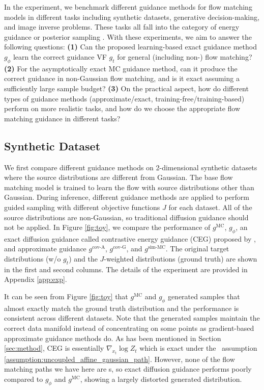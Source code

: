 


In the experiment, we benchmark different guidance methods for flow matching models in different tasks including synthetic datasets, generative decision-making, and image inverse problems. These tasks all fall into the category of energy guidance \citep{janner_planning_2022,lu_contrastive_nodate} or posterior sampling \cite{chung_diffusion_2024}. 
With these experiments, we aim to answer the following questions:
    \textbf{(1)} Can the proposed learning-based exact guidance method $g_\phi$ learn the correct guidance VF $g_t$ for general (including non-\diffusionpath) flow matching?
    \textbf{(2)} For the asymptotically exact MC guidance method, can it produce the correct guidance in non-Gaussian flow matching, and is it exact assuming a sufficiently large sample budget?
    \textbf{(3)} On the practical aspect, how do different types of guidance methods (approximate/exact, training-free/training-based) perform on more realistic tasks, and how do we choose the appropriate flow matching guidance in different tasks?



\subsection{Synthetic Dataset}
We first compare different guidance methods on 2-dimensional synthetic datasets where the source distributions are different from Gaussian. 
The base flow matching model is trained to learn the flow with source distributions other than Gaussian. 
During inference, different guidance methods are applied to perform guided sampling with different objective functions $J$ for each dataset. All of the source distributions are non-Gaussian, so traditional diffusion guidance should not be applied. In Figure \ref{fig:toy}, we compare the performance of $g^{\text{MC}}$, $g_\phi$, an exact diffusion guidance called contrastive energy guidance (CEG) proposed by \citet{lu_contrastive_nodate}, and approximate guidance $g^{\text{cov-A}}$, $g^{\text{cov-G}}$, and $g^{\text{sim-MC}}$. The original target distributions (w/o $g_t$) and the $J$-weighted distributions (ground truth) are shown in the first and second columns. 
The details of the experiment are provided in Appendix \ref{app:exp}.

It can be seen from Figure \ref{fig:toy} that $g^{\text{MC}}$ and $g_{\phi}$ generated samples that almost exactly match the ground truth distribution and the performance is consistent across different datasets. 
Note that the generated samples maintain the correct data manifold instead of concentrating on some points as gradient-based approximate guidance methods do.
As has been mentioned in Section \ref{sec:method}, CEG is essentially $\nabla_{x_t}\log Z_t$ which is exact under the \diffusionpath~assumption \ref{assumption:uncoupled_affine_gaussian_path}. However, none of the flow matching paths we have here are \diffusionpath s, so exact diffusion guidance performs poorly compared to $g_\phi$ and $g^{\text{MC}}$, showing a largely distorted generated distribution.



